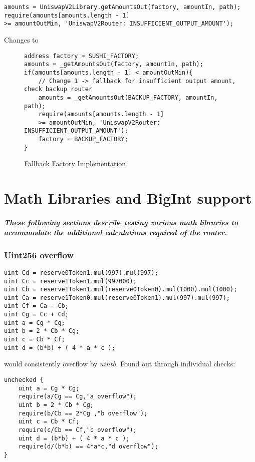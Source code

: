 \documentclass[runningheads]{llncs}
\begin{document}
\label{Fallback Factory:4}
\begin{verbatim}
amounts = UniswapV2Library.getAmountsOut(factory, amountIn, path);
require(amounts[amounts.length - 1]
>= amountOutMin, 'UniswapV2Router: INSUFFICIENT_OUTPUT_AMOUNT');
\end{verbatim}
Changes to
\begin{figure}
    \centering
    \caption{Fallback Factory Implementation}
    \label{fig:Fallback Factory Implementation}
\begin{verbatim}
address factory = SUSHI_FACTORY;
amounts = _getAmountsOut(factory, amountIn, path);
if(amounts[amounts.length - 1] < amountOutMin){
    // Change 1 -> fallback for insufficient output amount, check backup router
    amounts = _getAmountsOut(BACKUP_FACTORY, amountIn, path);
    require(amounts[amounts.length - 1] 
    >= amountOutMin, 'UniswapV2Router: INSUFFICIENT_OUTPUT_AMOUNT');
    factory = BACKUP_FACTORY;
}
\end{verbatim}
\end{figure}

\chapter{Math Libraries and BigInt support}

\paragraph{These following sections describe testing various math libraries to accommodate the additional calculations required of the router.}

\subsection{Uint256 overflow}
\label{Uint256 overflow:5}
\begin{verbatim}
uint Cd = reserve0Token1.mul(997).mul(997);
uint Cc = reserve1Token1.mul(997000);
uint Cb = reserve1Token1.mul(reserve0Token0).mul(1000).mul(1000);
uint Ca = reserve1Token0.mul(reserve0Token1).mul(997).mul(997);
uint Cf = Ca - Cb;
uint Cg = Cc + Cd;
uint a = Cg * Cg;
uint b = 2 * Cb * Cg;
uint c = Cb * Cf;
uint d = (b*b) + ( 4 * a * c ); 
\end{verbatim}

would consistently overflow by $uint b$. Found out through individual checks:
\begin{verbatim}
unchecked {
    uint a = Cg * Cg;
    require(a/Cg == Cg,"a overflow");
    uint b = 2 * Cb * Cg;
    require(b/Cb == 2*Cg ,"b overflow");
    uint c = Cb * Cf;
    require(c/Cb == Cf,"c overflow");
    uint d = (b*b) + ( 4 * a * c );
    require(d/(b*b) == 4*a*c,"d overflow");
}
\end{verbatim}
\newpage
\end{document}
